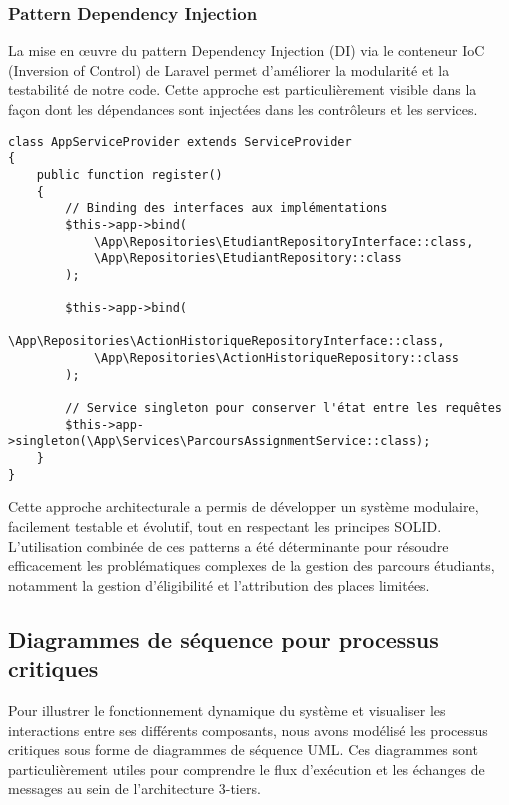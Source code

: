 \documentclass[french,12pt]{report} %
\begin{document}
\subsubsection{Pattern Dependency Injection}

La mise en œuvre du pattern Dependency Injection (DI) via le conteneur IoC (Inversion of Control) de Laravel permet d'améliorer la modularité et la testabilité de notre code. Cette approche est particulièrement visible dans la façon dont les dépendances sont injectées dans les contrôleurs et les services.

\begin{lstlisting}[style=phpstyle, caption={Configuration du conteneur IoC - AppServiceProvider.php}]
class AppServiceProvider extends ServiceProvider
{
    public function register()
    {
        // Binding des interfaces aux implémentations
        $this->app->bind(
            \App\Repositories\EtudiantRepositoryInterface::class,
            \App\Repositories\EtudiantRepository::class
        );
        
        $this->app->bind(
            \App\Repositories\ActionHistoriqueRepositoryInterface::class,
            \App\Repositories\ActionHistoriqueRepository::class
        );
        
        // Service singleton pour conserver l'état entre les requêtes
        $this->app->singleton(\App\Services\ParcoursAssignmentService::class);
    }
}
\end{lstlisting}

Cette approche architecturale a permis de développer un système modulaire, facilement testable et évolutif, tout en respectant les principes SOLID. L'utilisation combinée de ces patterns a été déterminante pour résoudre efficacement les problématiques complexes de la gestion des parcours étudiants, notamment la gestion d'éligibilité et l'attribution des places limitées.

\subsection{Diagrammes de séquence pour processus critiques}

Pour illustrer le fonctionnement dynamique du système et visualiser les interactions entre ses différents composants, nous avons modélisé les processus critiques sous forme de diagrammes de séquence UML. Ces diagrammes sont particulièrement utiles pour comprendre le flux d'exécution et les échanges de messages au sein de l'architecture 3-tiers.
\end{document}
